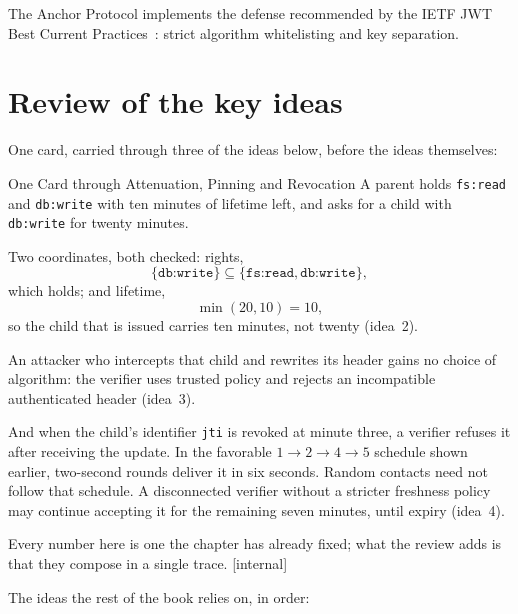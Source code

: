 \documentclass[11pt,a4paper]{article}
\theoremstyle{definition}
\begin{document}
The Anchor Protocol implements the defense recommended by the IETF JWT Best Current Practices~: strict algorithm whitelisting and key separation.

\section*{Review of the key ideas}
One card, carried through three of the ideas below, before the ideas themselves:

\begin{pdexample}{One Card through Attenuation, Pinning and Revocation}
\setlength{\parskip}{4pt plus 1pt}
A parent holds \texttt{fs:read} and \texttt{db:write} with ten minutes of
lifetime left, and asks for a child with \texttt{db:write} for twenty minutes.

Two coordinates, both checked: rights,
\[
\{\texttt{db:write}\} \subseteq \{\texttt{fs:read},\texttt{db:write}\},
\]
which
holds; and lifetime,
\[
\min(20,10) = 10,
\]
so the child that is issued carries
ten minutes, not twenty (idea~2).

An attacker who intercepts that child and
rewrites its header gains no choice of algorithm: the verifier uses trusted
policy and rejects an incompatible authenticated header (idea~3).

And when the child's identifier \texttt{jti} is revoked at minute three, a verifier refuses it after receiving the update. In the favorable
$1\to2\to4\to5$ schedule shown earlier, two-second rounds deliver it in
six seconds. Random contacts need not follow that schedule. A disconnected
verifier without a stricter freshness policy may continue accepting it for
the remaining seven minutes, until expiry (idea~4).

Every number here is one the
chapter has already fixed; what the review adds is that they compose in a
single trace. [internal]
\end{pdexample}

The ideas the rest of the book relies on, in order:
\end{document}
